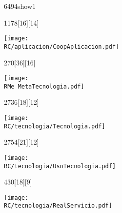 \begin{NuevaPagina}{64}{94}{show1}
	\begin{NuevoParrafo}{11}{78}[16][14]
		\begin{Marco}[\LineaSupC][\LineaInfC][\LineaIzqC][\LineaDerC][CBlanco]
			\subseccionC{\PVCOA}%
			\centering\texttt{[image: \\RC/aplicacion/CoopAplicacion.pdf]}		
		\end{Marco}
	\end{NuevoParrafo}	
	\begin{NuevoParrafo}{27}{0}[36][16]
		\begin{Marco}[\LineaSupC][\LineaInfC][\LineaIzqC][\LineaDerC][CBlanco]
			\centering\texttt{[image: \\RMe MetaTecnologia.pdf]}
		\end{Marco}
	\end{NuevoParrafo}
	
	\begin{NuevoParrafo}{27}{36}[18][12]
		\begin{Marco}[\LineaSupC][\LineaInfC][\LineaIzqC][\LineaDerC][CBlanco]
			\subseccionC{\PVTec}%
			\centering\texttt{[image: \\RC/tecnologia/Tecnologia.pdf]}
		\end{Marco}
	\end{NuevoParrafo}
	
	\begin{NuevoParrafo}{27}{54}[21][12]
		\begin{Marco}[\LineaSupC][\LineaInfC][\LineaIzqC][\LineaDerC][CBlanco]
			\subseccionC{\PVUTe}%
			\centering\texttt{[image: \\RC/tecnologia/UsoTecnologia.pdf]}
		\end{Marco}
	\end{NuevoParrafo}
	
	\begin{NuevoParrafo}{43}{0}[18][9]
		\begin{Marco}[\LineaSupC][\LineaInfC][\LineaIzqC][\LineaDerC][CBlanco]
			\subseccionC{\PVRSe}%
			\centering\texttt{[image: \\RC/tecnologia/RealServicio.pdf]}
			
		\end{Marco}
	\end{NuevoParrafo}
	

\end{NuevaPagina}
